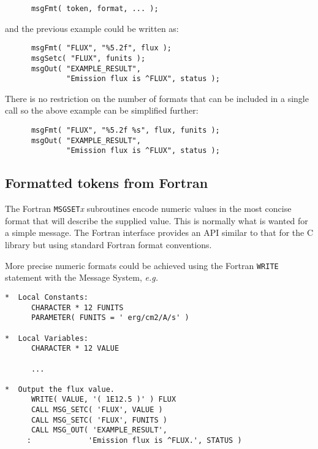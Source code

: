 \documentclass[twoside,11pt]{article}
\newcommand{\xlabel}[1]{}
\renewcommand{\_}{\texttt{\symbol{95}}}
\newcommand{\func}[1]{\texttt{#1}}
\begin{document}
\begin{small}
\begin{verbatim}
      msgFmt( token, format, ... );
\end{verbatim}
\end{small}

and the previous example could be written as:

\begin{small}
\begin{verbatim}
      msgFmt( "FLUX", "%5.2f", flux );
      msgSetc( "FLUX", funits );
      msgOut( "EXAMPLE_RESULT",
              "Emission flux is ^FLUX", status );
\end{verbatim}
\end{small}

There is no restriction on the number of formats that can be included
in a single call so the above example can be simplified further:

\begin{small}
\begin{verbatim}
      msgFmt( "FLUX", "%5.2f %s", flux, funits );
      msgOut( "EXAMPLE_RESULT",
              "Emission flux is ^FLUX", status );
\end{verbatim}
\end{small}

\subsection{\xlabel{fortran_formatted_tokens}Formatted tokens from Fortran}

The Fortran \func{MSG\_SET}\textit{x} subroutines encode numeric values in the most concise 
format that will describe the supplied value. 
This is normally what is wanted for a simple message. The Fortran
interface provides an API similar to that for the C library but using
standard Fortran format conventions. 

More precise numeric formats could be achieved using the Fortran \func{WRITE}
statement with the Message System, \textit{e.g.}

\begin {small}
\begin{verbatim}
*  Local Constants:
      CHARACTER * 12 FUNITS
      PARAMETER( FUNITS = ' erg/cm2/A/s' )

*  Local Variables:
      CHARACTER * 12 VALUE

      ...

*  Output the flux value.
      WRITE( VALUE, '( 1E12.5 )' ) FLUX
      CALL MSG_SETC( 'FLUX', VALUE )
      CALL MSG_SETC( 'FLUX', FUNITS )
      CALL MSG_OUT( 'EXAMPLE_RESULT', 
     :             'Emission flux is ^FLUX.', STATUS )
\end{verbatim}
\end {small}
\end{document}
